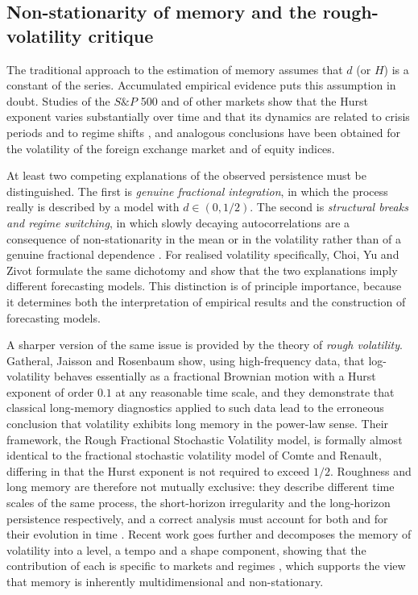 \documentclass[journal]{IEEEtran}
\begin{document}
\subsection{Non-stationarity of memory and the rough-volatility critique}

The traditional approach to the estimation of memory assumes that $d$ (or $H$) is a constant of
the series. Accumulated empirical evidence puts this assumption in doubt. Studies of the
$S\&P$ 500 and of other markets show that the Hurst exponent varies substantially over time and
that its dynamics are related to crisis periods and to regime shifts \cite{vogl2023hurst}, and
analogous conclusions have been obtained for the volatility of the foreign exchange market and of
equity indices.

At least two competing explanations of the observed persistence must be distinguished. The first
is \emph{genuine fractional integration}, in which the process really is described by a model with
$d\in(0,1/2)$. The second is \emph{structural breaks and regime switching}, in which slowly
decaying autocorrelations are a consequence of non-stationarity in the mean or in the volatility
rather than of a genuine fractional dependence \cite{banerjee2005modelling,mikosch2004non}.
For realised volatility specifically, Choi, Yu and Zivot \cite{choi2010long} formulate the same
dichotomy and show that the two explanations imply different forecasting models.
This distinction is of principle importance, because it determines both the interpretation of
empirical results and the construction of forecasting models.

A sharper version of the same issue is provided by the theory of \emph{rough volatility}.
Gatheral, Jaisson and Rosenbaum \cite{gatheral2018rough} show, using high-frequency data, that
log-volatility behaves essentially as a fractional Brownian motion with a Hurst exponent of order
$0.1$ at any reasonable time scale, and they demonstrate that classical long-memory diagnostics
applied to such data lead to the erroneous conclusion that volatility exhibits long memory in the
power-law sense. Their framework, the Rough Fractional Stochastic Volatility model, is formally
almost identical to the fractional stochastic volatility model of Comte and Renault, differing in
that the Hurst exponent is not required to exceed $1/2$. Roughness and long memory are therefore
not mutually exclusive: they describe different time scales of the same process, the short-horizon
irregularity and the long-horizon persistence respectively, and a correct analysis must account
for both and for their evolution in time \cite{bennedsen2022decoupling}. Recent work goes further
and decomposes the memory of volatility into a level, a tempo and a shape component, showing that
the contribution of each is specific to markets and regimes \cite{choi2025three}, which supports
the view that memory is inherently multidimensional and non-stationary.
\end{document}
